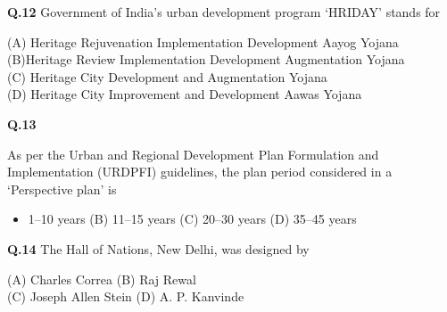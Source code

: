 \documentclass{article}
\begin{document}
\noindent \textbf{Q.12} \hspace{0.5cm} Government of India’s urban development program ‘HRIDAY’ stands for
\vspace{0.15cm}
\begin{flushleft}
    
  \hspace{1.5cm} (A) Heritage Rejuvenation Implementation Development Aayog Yojana\\
  \hspace{1.5cm} (B)Heritage Review Implementation Development Augmentation Yojana\\
  \hspace{1.5cm} (C) Heritage City Development and Augmentation Yojana\\
  \hspace{1.5cm} (D) Heritage City Improvement and Development Aawas Yojana\\
\end{flushleft}

\vspace{0.3cm}

\noindent \textbf{Q.13} \hspace{0.4cm} \parbox[t]{13cm}{ As per the Urban and Regional Development Plan Formulation and Implementation (URDPFI) guidelines, the plan period considered in a ‘Perspective plan’ is}
\vspace{0.4cm}

\begin{itemize}[label={}, leftmargin=2.2cm]
  \item[(A)] 1–10 years \hspace{1.8cm} (B) 11–15 years \hspace{1.8cm} (C) 20–30 years \hspace{1.8cm} (D) 35–45 years
\end{itemize}

\vspace{0.2cm}

\noindent \textbf{Q.14} \hspace{0.5cm} The Hall of Nations, New Delhi, was designed by

\begin{flushleft}
    \hspace{2.2cm} (A) Charles Correa \hspace{3.5cm} (B) Raj Rewal \\
    \hspace{2.3cm}(C) Joseph Allen Stein \hspace{3cm} (D) A. P. Kanvinde
\end{flushleft} 
\vspace{0.6cm}
\end{document}
